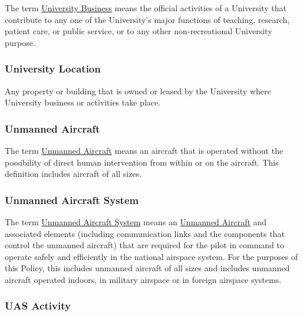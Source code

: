 \documentclass[
]{book}
\begin{document}
The term \protect\hyperlink{UB}{University Business} means the official activities of a University that contribute to any one of the University's major functions of teaching, research, patient care, or public service, or to any other non-recreational University purpose.



\hypertarget{UL}{%
\subsubsection*{University Location}\label{UL}}

Any property or building that is owned or leased by the University where University business or activities take place.



\hypertarget{UA}{%
\subsubsection*{Unmanned Aircraft}\label{UA}}

The term \protect\hyperlink{UA}{Unmanned Aircraft} means an aircraft that is operated without the possibility of direct human intervention from within or on the aircraft. This definition includes aircraft of all sizes.





\hypertarget{UAS}{%
\subsubsection*{Unmanned Aircraft System}\label{UAS}}

The term \protect\hyperlink{UAS}{Unmanned Aircraft System} means an \protect\hyperlink{UA}{Unmanned Aircraft} and associated elements (including communication links and the components that control the unmanned aircraft) that are required for the pilot in command to operate safely and efficiently in the national airspace system. For the purposes of this Policy, this includes unmanned aircraft of all sizes and includes unmanned aircraft operated indoors, in military airspace or in foreign airspace systems.







\hypertarget{UASactivity}{%
\subsubsection*{UAS Activity}\label{UASactivity}}
\end{document}
